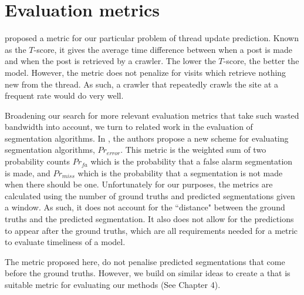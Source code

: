 
\section{Evaluation metrics}
 proposed a metric for our particular problem of thread update 
prediction. Known as the $T$-score, it gives the average time difference between 
when a post is made and when the post is retrieved by a crawler. The lower the 
$T$-score, the better the model. However, the metric does not penalize for 
visits which retrieve nothing new from the thread.  As such, a crawler that 
repeatedly crawls the site at a frequent rate would do very well.

Broadening our search for more relevant evaluation metrics that take such
wasted bandwidth into account, we turn to related work in the evaluation of
segmentation algorithms.  In , the authors propose a
new scheme for evaluating segmentation algorithms, $Pr_{error}$. This metric is 
the weighted sum of two probability counts $Pr_{fa}$ which is the probability 
that a false alarm segmentation is made, and $Pr_{miss}$ which is the 
probability that a segmentation is not made when there should be one.  
Unfortunately for our purposes, the metrics are calculated using the number of 
ground truths and predicted segmentations given a window. As such, it does not 
account for the ``distance" between the ground truths and the predicted 
segmentation.  It also does not allow for the predictions to appear after the 
ground truths, which are all requirements needed for a metric to evaluate 
timeliness of a model.

The metric proposed here, do not penalise predicted segmentations that come 
before the ground truths. However, we build on similar ideas to create a that is 
suitable metric for evaluating our methods (See Chapter 4).

